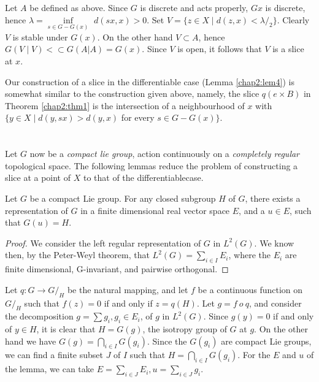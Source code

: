 Let $A$  be defined as above. Since $G$ is  discrete  and  acts
properly, $Gx$  is  discrete, hence  $ \lambda =  \inf \limits_{ s
  \in  G-G (x) } $  $ d ( sx, x ) > 0 $. Set  $   V = \{  z \in  X
\mid d ( z,x) <  \lambda  /_{2} \}  $. Clearly  $V $ is  stable under
$ G (x) $. On the other hand $V \subset A $,  hence $ G ( V  \mid  V )
< \subset G ( A|A )  = G (x) $. Since  $ V $ is  open, it follows that
$V$ is  a slice at $x$. 
   
   Our construction of a slice in the differentiable case (Lemma \ref{chap2:lem4})  
   is somewhat similar to the  construction given above, namely,
   the slice  $ q ( e \times B ) $ in Theorem \ref{chap2:thm1}  is the
   intersection of a  neighbourhood  of $ x $ with $ \{ y \in  X \mid
   d ( y, sx )  > d ( y, x)  $ for every  $ s \in  G - G (x) \}$. 
   

\section{}%

   Let  $ G $ now  be a  \textit{compact lie group}, action continuously on
   a  \textit{completely regular} topological space. The following
   lemmas reduce  the  problem of  constructing a slice at a point of
   $X$  to  that of the differentiable\pageoriginale case. 

\begin{lem}\label{chap2:lem5}%
  Let $G$ be a compact Lie group. For any closed subgroup $H$ of $G$,
  there exists a representation of $G$ in a finite dimensional real
  vector space $E$, and a $u \in E$, such that $G(u) = H$. 
\end{lem}  

\begin{proof}
  We consider the left regular representation of $G$ in $L^2 (G)$. We
  know then, by the Peter-Weyl theorem, that $L^2 (G) = \sum\limits_{i
    \in I} E_i$, where the $E_i$ are finite dimensional, G-invariant,
  and pairwise orthogonal. 
\end{proof}

Let $q:G \to G/_H$ be the natural mapping, and let $f$ be a continuous
function on $G/_H$ such that $f(z) = 0$ if and only if $z = q(H)$. Let
$g = f ~ o ~ q$, and consider the decomposition $g = \sum g_i, g_i \in
E_i$, of $g$ in $L^2 (G)$. Since $g(y) = 0$ if and only of $y \in H$,
it is clear that $H = G (g)$, the isotropy group of $G$ at $g$. On the
other hand we have $G(g) = \bigcap\limits_{i \in I} G (g_i)$. Since
the $G(g_i)$ are compact Lie groups, we can find a finite subset $J$
of $I$ such that $H = \bigcap\limits_{i \in I} G (g_i)$. For the $E$
and $u$ of the lemma, we can take $E = \sum\limits_{i \in J} E_i, u =
\sum\limits_{i \in J} g_i$.  

